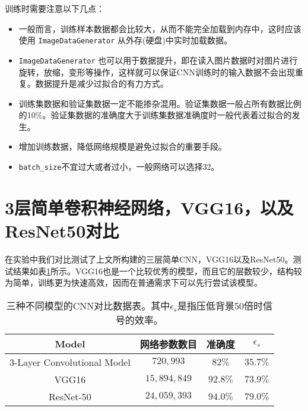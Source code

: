 \vspace{0.5cm}

训练时需要注意以下几点：

\begin{itemize}
    \item 一般而言，训练样本数据都会比较大，从而不能完全加载到内存中，这时应该使用 \verb|ImageDataGenerator| 从外存(硬盘)中实时加载数据。
    \item \verb|ImageDataGenerator| 也可以用于数据提升，即在读入图片数据时对图片进行旋转，放缩，变形等操作，这样就可以保证CNN训练时的输入数据不会出现重复。数据提升是减少过拟合的有力方式。
    \item 训练集数据和验证集数据一定不能掺杂混用。验证集数据一般占所有数据比例的10\%。验证集数据的准确度大于训练集数据准确度时一般代表着过拟合的发生。
    \item 增加训练数据，降低网络规模是避免过拟合的重要手段。
    \item \verb|batch_size|不宜过大或者过小，一般网络可以选择32。
\end{itemize}


\section{3层简单卷积神经网络，VGG16，以及ResNet50对比}
\label{section:resnet_compare}

在实验中我们对比测试了上文所构建的三层简单CNN，VGG16以及ResNet50。测试结果如表\ref{tab:cnn_compare}所示。VGG16也是一个比较优秀的模型，而且它的层数较少，结构较为简单，训练更为快速高效，因而在普通需求下可以先行尝试该模型。
\renewcommand\arraystretch{1.4}
\begin{table}[hbt]
    \centering
    \begin{tabular}{cccc}
      \hline
      Model & 网络参数数目 & 准确度 & $\epsilon_{s}$ \\\hline
      3-Layer Convolutional Model & $720,993$ & $82\%$  & $35.7\%$ \\
      VGG16 & $15,894,849$ & $92.8\%$  & $73.9\%$ \\
      ResNet-50 & $24,059,393$ & $94.0\%$ & $79.0\%$ \\\hline
    \end{tabular}
    \caption{三种不同模型的CNN对比数据表。其中$\epsilon_{s}$是指压低背景50倍时信号的效率。}
    \label{tab:cnn_compare}
  \end{table}
  
  